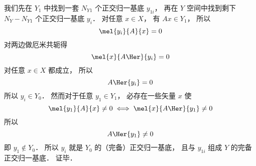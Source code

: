 我们先在 $Y_1$ 中找到一套 $N_{Y1}$ 个正交归一基底 ${y_{1i}}$， 再在 $Y$ 空间中找到剩下 $N_Y - N_{Y1}$ 个正交归一基底 ${y_i}$． 对任意 ${x} \in X$， 有 $A {x} \in Y_1$， 所以
\begin{equation}
\mel{y_i}{A}{x} = 0
\end{equation}
对两边做厄米共轭得%
\begin{equation}
\mel{x}{A\Her}{y_i} = 0
\end{equation}
对任意 ${x}\in X$ 都成立， 所以
\begin{equation}
A\Her{y_i} = 0
\end{equation}
所以 ${y_i} \in Y_0$． 然而对于任意 ${y_1} \in Y_1$， 必存在一些矢量 ${x}$ 使
\begin{equation}
\mel{y_1}{A}{x} \ne 0
\iff
\mel{x}{A\Her}{y_1} \ne 0
\end{equation}
所以
\begin{equation}
A\Her{y_1} \ne 0
\end{equation}
即 ${y_1} \notin Y_0$． 所以 ${y_i}$ 就是 $Y_0$ 的（完备）正交归一基底， 且与 ${y_{1i}}$ 组成 $Y$ 的完备正交归一基底． 证毕．
